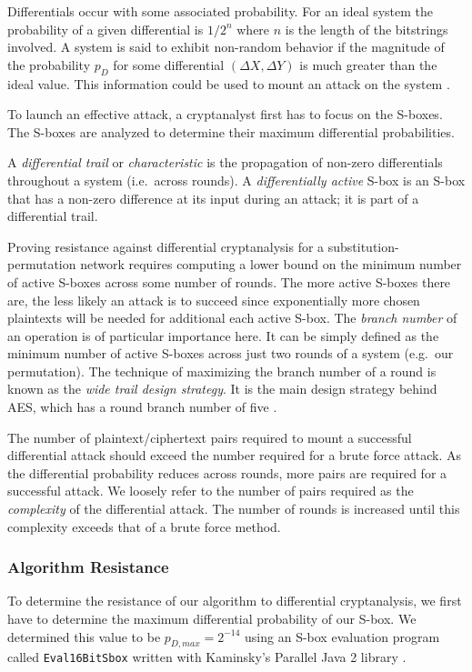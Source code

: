 Differentials occur with some associated probability.
For an ideal system the probability of a given differential is $1/2^n$ where $n$ is the length of the bitstrings involved.
A system is said to exhibit non-random behavior if the magnitude of the probability $p_D$ for some differential $(\Delta X, \Delta Y)$ is much greater than the ideal value.
This information could be used to mount an attack on the system \cite{Heys2002_Tutorial}.

To launch an effective attack, a cryptanalyst first has to focus on the S-boxes.
The S-boxes are analyzed to determine their maximum differential probabilities.

A \emph{differential trail} or \emph{characteristic} is the propagation of non-zero differentials throughout a system (i.e.\ across rounds).
A \emph{differentially active} S-box is an S-box that has a non-zero difference at its input during an attack; it is part of a differential trail.

Proving resistance against differential cryptanalysis for a substitution-permutation network requires computing a lower bound on the minimum number of active S-boxes across some number of rounds.
The more active S-boxes there are, the less likely an attack is to succeed since exponentially more chosen plaintexts will be needed for additional each active S-box.
The \emph{branch number} of an operation is of particular importance here. 
It can be simply defined as the minimum number of active S-boxes across just two rounds of a system (e.g.\ our permutation).
The technique of maximizing the branch number of a round is known as the \emph{wide trail design strategy}.
It is the main design strategy behind AES, which has a round branch number of five \cite{Daemen2001_WideTrail}\cite{Daemen2002_DesignOfRijndael}.

The number of plaintext/ciphertext pairs required to mount a successful differential attack should exceed the number required for a brute force attack.
As the differential probability reduces across rounds, more pairs are required for a successful attack.
We loosely refer to the number of pairs required as the \emph{complexity} of the differential attack.
The number of rounds is increased until this complexity exceeds that of a brute force method.

\subsubsection{Algorithm Resistance}
To determine the resistance of our algorithm to differential cryptanalysis, we first have to determine the maximum differential probability of our S-box.
We determined this value to be $p_{D,max} = 2^{-14}$ using an S-box evaluation program called \texttt{Eval16BitSbox} \cite{Kaminsky2014_BlockCipherAnalysis} written with Kaminsky's Parallel Java 2 library \cite{Kaminsky2014_PJ2}.

